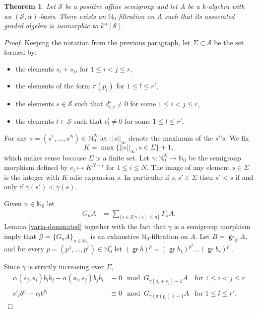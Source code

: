 \documentclass[11pt,fleqn]{article}
\theoremstyle{plain}
\newtheorem{Theorem}{Theorem}[section]
\theoremstyle{remark}
\theoremstyle{definition}
\newcommand\NN{\mathbb N}
\renewcommand\to{\longrightarrow}
\renewcommand\S{\mathcal S}
\newcommand\G{\mathcal G}
\DeclareMathOperator\gr{\mathsf{gr}}
\begin{document}
\begin{Theorem}
\label{deformation}
Let $\S$ be a positive affine semigroup and let $A$ be a $k$-algebra with an
$(\S,\alpha)$-basis. There exists an $\NN_0$-filtration on $A$ such that its associated
graded algebra is isomorphic to $k^\alpha[\S]$.
\end{Theorem}
\begin{proof}
Keeping the notation from the previous paragraph, let $\Sigma \subset \S$ be the set
formed by:
\begin{itemize}
	\item the elements $s_i + s_j$, for $1 \leq i < j \leq r$,
	\item the elements of the form $\pi(p_l)$ for $1 \leq l \leq r'$,
	\item the elements $s \in \S$ such that $d_{i,j}^s \neq 0$ for some $1 \leq i < j
		\leq r$,
	\item the elements $t \in \S$ such that $c_l^t \neq 0$ for some $1 \leq l \leq
		r'$.
\end{itemize}
For any $s = (s^1, \ldots, s^N) \in \NN_0^N$ let $||s||_\infty$ denote the
maximum of the $s^i$'s. We fix
$$K = \max \{||s||_{\infty}, s \in \Sigma\} + 1,$$ 
which makes sense because $\Sigma$ is a finite set. Let $\gamma: \NN_0^N \to \NN_0$ be the
semigroup morphism defined by $e_i \mapsto K^{N-i}$ for $1 \leq i \leq N$. The image of
any element $s \in \Sigma$ is the integer with $K$-adic expansion $s$. In particular if $s, 
s' \in \Sigma$ then $s' < s$ if and only if $\gamma(s') < \gamma(s)$.

Given $n \in \NN_0$ let 
\begin{align*}
G_nA &= \sum_{\{s \in \S| \gamma(s) \leq n\}} F_sA.
\end{align*}
Lemma \ref{varia-dominated} together with the fact that $\gamma$ is a semigroup morphism 
imply that $\mathcal G = \{G_nA\}_{n \in \NN_0}$ is an exhaustive $\NN_0$-filtration on 
$A$. Let $B = \gr_\G A$, and for every $p = (p^1, \ldots, p^r) \in \NN_0^r$ let $(\gr b)^p
= (\gr b_1)^{p^1} \ldots (\gr b_r)^{p^r}$. 

Since $\gamma$ is strictly increasing over $\Sigma$, 
\begin{align*}
\label{pre-eq}
\tag{$\dagger$}
  \alpha(s_j,s_i) b_i b_j - \alpha(s_i,s_j) b_j b_i &\equiv 0 \mod G_{\gamma(s_i + s_j)-1}A &
 \mbox{for } 1 \leq i < j \leq r\\
 c'_l b^{p_l} - c_l b^{p_l'} &\equiv 0 \mod G_{\gamma(\pi(p_l))-1}A & \mbox{for } 1 \leq l
 \leq r'.
\end{align*}


\end{proof}
\end{document}
